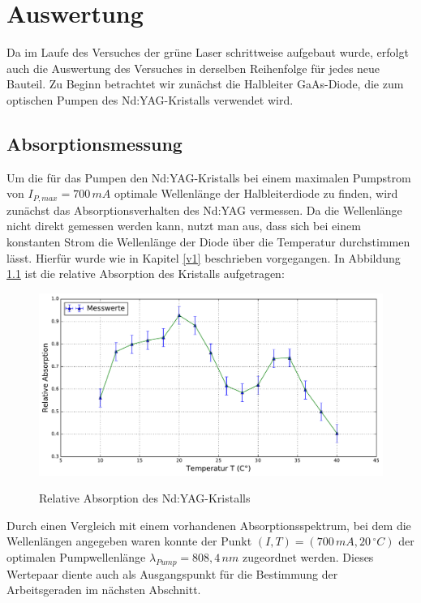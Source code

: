 \documentclass[twoside,colorback,accentcolor=tud4c,11pt]{tudreport}
\begin{document}
     	
\chapter{Auswertung}
Da im Laufe des Versuches der grüne Laser schrittweise aufgebaut wurde, erfolgt auch die  Auswertung des Versuches in derselben Reihenfolge für jedes neue Bauteil. Zu Beginn betrachtet wir zunächst die Halbleiter GaAs-Diode, die zum optischen Pumpen des Nd:YAG-Kristalls verwendet wird.
\section{Absorptionsmessung}
Um die für das Pumpen den Nd:YAG-Kristalls bei einem maximalen Pumpstrom von $I_{P,max}=700\,\si{mA}$ optimale Wellenlänge der Halbleiterdiode zu finden, wird zunächst das Absorptionsverhalten des Nd:YAG vermessen. Da die Wellenlänge nicht direkt gemessen werden kann, nutzt man aus, dass sich bei einem konstanten Strom die Wellenlänge der Diode über die Temperatur durchstimmen lässt. Hierfür wurde wie in Kapitel \ref{v1} beschrieben vorgegangen. In Abbildung \ref{abs} ist die relative Absorption des Kristalls aufgetragen:
\begin{figure}[H]
\centering
   	\begin{minipage}[b]{0.85\textwidth}
   	\includegraphics[width=\textwidth]{graphics/relabs_ndyag.pdf}
  	\label{abs}
   	\end{minipage}
\caption{Relative Absorption des Nd:YAG-Kristalls}	
\end{figure}
Durch einen Vergleich mit einem vorhandenen Absorptionsspektrum, bei dem die Wellenlängen angegeben waren konnte der Punkt $(I,T)=(700\,\si{mA},20\,\si{^{\circ}C})$ der optimalen Pumpwellenlänge $\lambda_{Pump}=808,4\,\si{nm}$ zugeordnet werden. Dieses Wertepaar diente auch als Ausgangspunkt für die Bestimmung der Arbeitsgeraden im nächsten Abschnitt.
\end{document}

